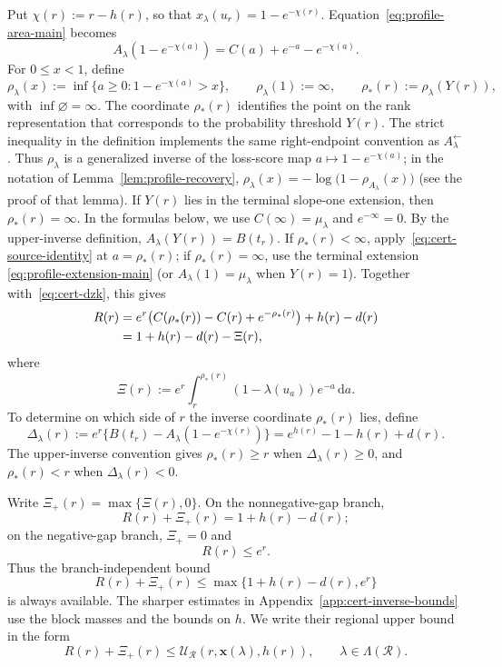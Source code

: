 \documentclass[11pt]{article}
\theoremstyle{definition}
\theoremstyle{remark}
\newcommand{\dd}{\,\mathrm d}
\begin{document}
Put $\chi(r):=r-h(r)$, so that
$x_\lambda(u_r)=1-e^{-\chi(r)}$.
Equation~\eqref{eq:profile-area-main} becomes
\begin{equation}\label{eq:cert-source-identity}
 A_\lambda(1-e^{-\chi(a)})
 =C(a)+e^{-a}-e^{-\chi(a)}.
\end{equation}
For $0\le x<1$, define
\[
 \rho_\lambda(x):=\inf\{a\ge0:1-e^{-\chi(a)}>x\},
 \qquad \rho_\lambda(1):=\infty,
 \qquad \rho_*(r):=\rho_\lambda(Y(r)),
\]
with $\inf\varnothing=\infty$.
The coordinate $\rho_*(r)$ identifies the point on the rank
representation that corresponds to the probability threshold $Y(r)$.
The strict inequality in the definition implements the same
right-endpoint convention as $A_\lambda^\leftarrow$.
Thus $\rho_\lambda$ is a generalized inverse of the loss-score map $a\mapsto1-e^{-\chi(a)}$; in the notation of Lemma~\ref{lem:profile-recovery}, $\rho_\lambda(x)=-\log\bigl(1-\rho_{A_\lambda}(x)\bigr)$ (see the proof of that lemma).
If $Y(r)$ lies in the terminal slope-one extension, then
$\rho_*(r)=\infty$.  In the formulas below, we use
$C(\infty)=\mu_\lambda$ and $e^{-\infty}=0$.
By the upper-inverse definition, $A_\lambda(Y(r))=B(t_r)$.
If $\rho_*(r)<\infty$, apply~\eqref{eq:cert-source-identity} at
$a=\rho_*(r)$; if $\rho_*(r)=\infty$, use the terminal extension
\eqref{eq:profile-extension-main} (or $A_\lambda(1)=\mu_\lambda$ when $Y(r)=1$).
Together with~\eqref{eq:cert-dzk}, this gives
\begin{align}
 R(r)
 &=e^r\bigl(C(\rho_*(r))-C(r)+e^{-\rho_*(r)}\bigr)
   +h(r)-d(r) \notag\\
 &=1+h(r)-d(r)-\Xi(r), \label{eq:cert-inverse-identity}
\end{align}
where
\[
 \Xi(r):=
 e^r\int_r^{\rho_*(r)}
 (1-\lambda(u_a))e^{-a}\dd a.
\]
To determine on which side of $r$ the inverse coordinate
$\rho_*(r)$ lies, define
\begin{equation}\label{eq:cert-area-gap}
 \Delta_\lambda(r)
 :=e^r\{B(t_r)-A_\lambda(1-e^{-\chi(r)})\}
 =e^{h(r)}-1-h(r)+d(r).
\end{equation}
The upper-inverse convention gives $\rho_*(r)\ge r$ when
$\Delta_\lambda(r)\ge0$, and $\rho_*(r)<r$ when
$\Delta_\lambda(r)<0$.

Write $\Xi_+(r)=\max\{\Xi(r),0\}$.  On the nonnegative-gap branch,
\begin{equation}\label{eq:cert-positive-basic}
 R(r)+\Xi_+(r)=1+h(r)-d(r);
\end{equation}
on the negative-gap branch, $\Xi_+=0$ and
\begin{equation}\label{eq:cert-negative-basic}
 R(r)\le e^r.
\end{equation}
Thus the branch-independent bound
\begin{equation}\label{eq:cert-U-fallback}
 R(r)+\Xi_+(r)\le\max\{1+h(r)-d(r),e^r\}
\end{equation}
is always available.  The sharper estimates in
Appendix~\ref{app:cert-inverse-bounds} use the block masses and the
bounds on $h$.  We write their regional upper bound in the form
\begin{equation}\label{eq:cert-U-condition}
 R(r)+\Xi_+(r)\le
 \mathcal U_{\mathcal R}(r,\mathbf x(\lambda),h(r)),
 \qquad \lambda\in\Lambda(\mathcal R).
\end{equation}
\end{document}
